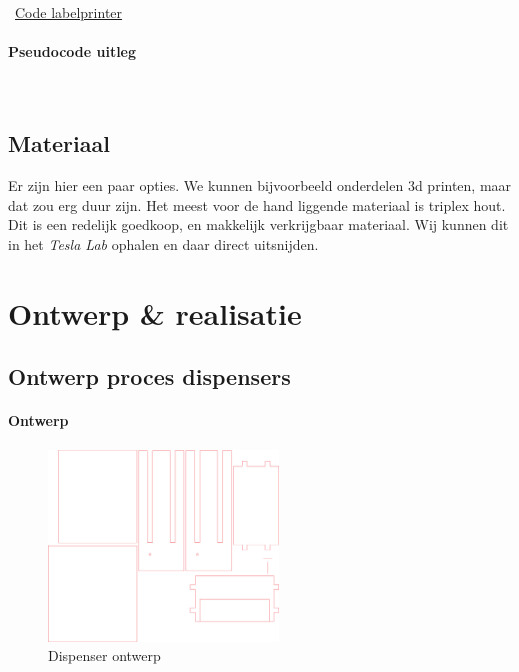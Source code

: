 \documentclass{article}
\begin{document}
\Mundus~\href{https://github.com/Gewad/Project4Bankalicious/tree/master/bonnetjesPrinten}{Code labelprinter}

\paragraph{Pseudocode uitleg}\



\newpage

\subsection{Materiaal}

Er zijn hier een paar opties.
We kunnen bijvoorbeeld onderdelen 3d printen, maar dat zou erg duur zijn.
Het meest voor de hand liggende materiaal is triplex hout.
Dit is een redelijk goedkoop, en makkelijk verkrijgbaar materiaal.
Wij kunnen dit in het \emph{Tesla Lab} ophalen en daar direct uitsnijden.

\newpage

\section{Ontwerp \& realisatie}

\subsection{Ontwerp proces dispensers}

\paragraph{Ontwerp}

\begin{figure}[H]
       \centering
       \includegraphics[height=2.0in]{dispenser.pdf}
       \caption{Dispenser ontwerp}
       \label{fig: Dispenser ontwerp}
\end{figure}
\end{document}
